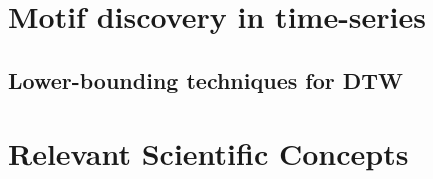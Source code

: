 \section{Motif discovery in time-series}
\subsection{Lower-bounding techniques for DTW}

\section{{Relevant Scientific Concepts}}